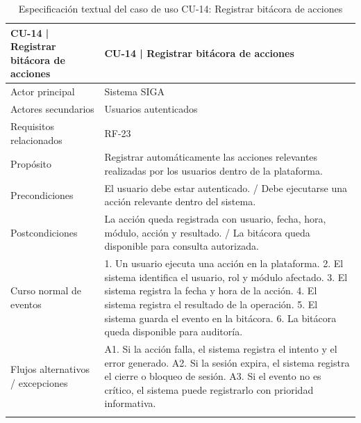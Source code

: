 \begingroup
\small
\begin{longtable}{|p{7.8cm}|p{7.8cm}|}
\hline
CU-14 | Registrar bitácora de acciones & CU-14 | Registrar bitácora de acciones \\ \hline
Actor principal & Sistema SIGA \\ \hline
Actores secundarios & Usuarios autenticados \\ \hline
Requisitos relacionados & RF-23 \\ \hline
Propósito & Registrar automáticamente las acciones relevantes realizadas por los usuarios dentro de la plataforma. \\ \hline
Precondiciones & El usuario debe estar autenticado. / Debe ejecutarse una acción relevante dentro del sistema. \\ \hline
Postcondiciones & La acción queda registrada con usuario, fecha, hora, módulo, acción y resultado. / La bitácora queda disponible para consulta autorizada. \\ \hline
Curso normal de eventos & 1. Un usuario ejecuta una acción en la plataforma. 2. El sistema identifica el usuario, rol y módulo afectado. 3. El sistema registra la fecha y hora de la acción. 4. El sistema registra el resultado de la operación. 5. El sistema guarda el evento en la bitácora. 6. La bitácora queda disponible para auditoría. \\ \hline
Flujos alternativos / excepciones & A1. Si la acción falla, el sistema registra el intento y el error generado. A2. Si la sesión expira, el sistema registra el cierre o bloqueo de sesión. A3. Si el evento no es crítico, el sistema puede registrarlo con prioridad informativa. \\ \hline
\caption{Especificación textual del caso de uso CU-14: Registrar bitácora de acciones}
\end{longtable}
\endgroup


